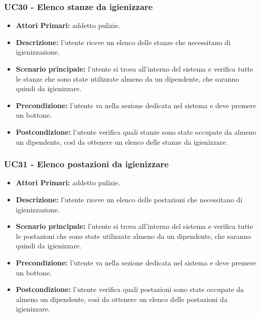 \subsubsection{UC30 - Elenco stanze da igienizzare}
\begin{itemize}
           	\item\textbf{Attori Primari:} addetto pulizie.
           	\item\textbf{Descrizione:} l'utente riceve un elenco delle stanze che necessitano di igienizzazione.
           	\item\textbf{Scenario principale:} l'utente si trova all'interno del sistema e verifica tutte le stanze che sono state utilizzate almeno da un dipendente, che saranno quindi da igienizzare.
           	\item\textbf{Precondizione:} l'utente va nella sezione dedicata nel sistema e deve premere un bottone.
           	\item\textbf{Postcondizione:} l'utente verifica quali stanze sono state occupate da almeno un dipendente, così da ottenere un elenco delle stanze da igienizzare.
\end{itemize}
\subsubsection{UC31 - Elenco postazioni da igienizzare}
\begin{itemize}
           	\item\textbf{Attori Primari:} addetto pulizie.
           	\item\textbf{Descrizione:} l'utente riceve un elenco delle postazioni che necessitano di igienizzazione.
           	\item\textbf{Scenario principale:} l'utente si trova all'interno del sistema e verifica tutte le postazioni che sono state utilizzate almeno da un dipendente, che saranno quindi da igienizzare.
           	\item\textbf{Precondizione:} l'utente va nella sezione dedicata nel sistema e deve premere un bottone.
           	\item\textbf{Postcondizione:} l'utente verifica quali postazioni sono state occupate da almeno un dipendente, così da ottenere un elenco delle postazioni da igienizzare.
\end{itemize}


